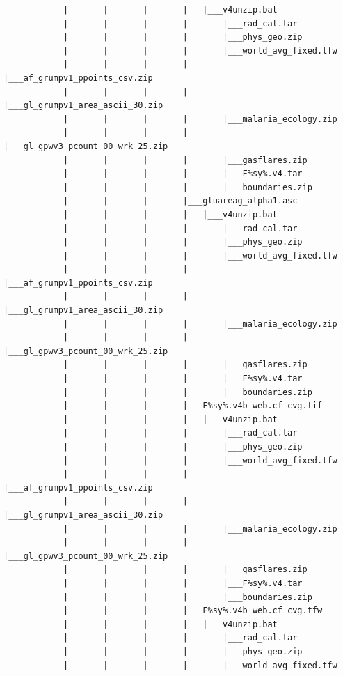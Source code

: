 \documentclass[]{book}
\begin{document}
\begin{verbatim}
            |       |       |       |   |___v4unzip.bat
            |       |       |       |       |___rad_cal.tar
            |       |       |       |       |___phys_geo.zip
            |       |       |       |       |___world_avg_fixed.tfw
            |       |       |       |       |___af_grumpv1_ppoints_csv.zip
            |       |       |       |       |___gl_grumpv1_area_ascii_30.zip
            |       |       |       |       |___malaria_ecology.zip
            |       |       |       |       |___gl_gpwv3_pcount_00_wrk_25.zip
            |       |       |       |       |___gasflares.zip
            |       |       |       |       |___F%sy%.v4.tar
            |       |       |       |       |___boundaries.zip
            |       |       |       |___gluareag_alpha1.asc
            |       |       |       |   |___v4unzip.bat
            |       |       |       |       |___rad_cal.tar
            |       |       |       |       |___phys_geo.zip
            |       |       |       |       |___world_avg_fixed.tfw
            |       |       |       |       |___af_grumpv1_ppoints_csv.zip
            |       |       |       |       |___gl_grumpv1_area_ascii_30.zip
            |       |       |       |       |___malaria_ecology.zip
            |       |       |       |       |___gl_gpwv3_pcount_00_wrk_25.zip
            |       |       |       |       |___gasflares.zip
            |       |       |       |       |___F%sy%.v4.tar
            |       |       |       |       |___boundaries.zip
            |       |       |       |___F%sy%.v4b_web.cf_cvg.tif
            |       |       |       |   |___v4unzip.bat
            |       |       |       |       |___rad_cal.tar
            |       |       |       |       |___phys_geo.zip
            |       |       |       |       |___world_avg_fixed.tfw
            |       |       |       |       |___af_grumpv1_ppoints_csv.zip
            |       |       |       |       |___gl_grumpv1_area_ascii_30.zip
            |       |       |       |       |___malaria_ecology.zip
            |       |       |       |       |___gl_gpwv3_pcount_00_wrk_25.zip
            |       |       |       |       |___gasflares.zip
            |       |       |       |       |___F%sy%.v4.tar
            |       |       |       |       |___boundaries.zip
            |       |       |       |___F%sy%.v4b_web.cf_cvg.tfw
            |       |       |       |   |___v4unzip.bat
            |       |       |       |       |___rad_cal.tar
            |       |       |       |       |___phys_geo.zip
            |       |       |       |       |___world_avg_fixed.tfw

\end{verbatim}
\end{document}
